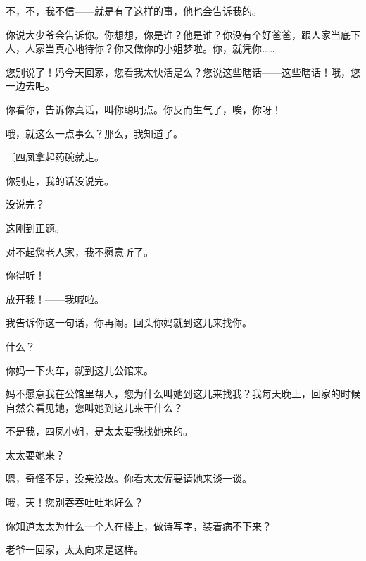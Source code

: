不，不，我不信——就是有了这样的事，他也会告诉我的。

你说大少爷会告诉你。你想想，你是谁？他是谁？你没有个好爸爸，跟人家当底下人，人家当真心地待你？你又做你的小姐梦啦。你，就凭你……

您别说了！妈今天回家，您看我太快活是么？您说这些瞎话——这些瞎话！哦，您一边去吧。

你看你，告诉你真话，叫你聪明点。你反而生气了，唉，你呀！

哦，就这么一点事么？那么，我知道了。

{\fangsong〔四凤拿起药碗就走。}

你别走，我的话没说完。

没说完？

这刚到正题。

对不起您老人家，我不愿意听了。

你得听！

放开我！——我喊啦。

我告诉你这一句话，你再闹。回头你妈就到这儿来找你。

什么？

你妈一下火车，就到这儿公馆来。

妈不愿意我在公馆里帮人，您为什么叫她到这儿来找我？我每天晚上，回家的时候自然会看见她，您叫她到这儿来干什么？

不是我，四凤小姐，是太太要我找她来的。

太太要她来？

嗯，奇怪不是，没亲没故。你看太太偏要请她来谈一谈。

哦，天！您别吞吞吐吐地好么？

你知道太太为什么一个人在楼上，做诗写字，装着病不下来？

老爷一回家，太太向来是这样。

